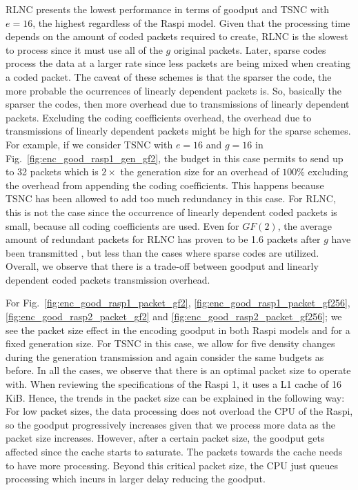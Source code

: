 \ac{RLNC} presents the lowest performance in terms of goodput and
\ac{TSNC} with $e = 16$, the highest regardless of the \ac{Raspi} model.
Given that the processing time depends on the amount of coded packets
required to create, \ac{RLNC} is the slowest to process since it must
use all of the $g$ original packets.
Later, sparse codes process the data
at a larger rate since less packets are being mixed when creating a
coded packet. The caveat of these schemes is that the sparser the code,
the more probable the ocurrences of linearly dependent packets is. So, basically
the sparser the codes, then more overhead due to transmissions of linearly dependent
packets.
Excluding the coding coefficients overhead, the overhead due to
transmissions of linearly dependent packets might be high for the sparse schemes.
For example, if we consider \ac{TSNC} with $e = 16$ and $g = 16$
in Fig.~\ref{fig:enc_good_rasp1_gen_gf2}, the budget in this case permits
to send up to 32 packets which is $2\times$ the generation
size for an overhead of $100\%$ excluding the overhead from appending
the coding coefficients. This happens because \ac{TSNC}
has been allowed to add too much redundancy in this case.
For \ac{RLNC},
this is not the case since the occurrence of linearly dependent coded packets is
small, because all coding coefficients are used. Even for $GF(2)$, the
average amount of redundant packets for \ac{RLNC} has proven to be 1.6
packets after $g$ have been transmitted \cite{trullols2011exact,zhao2012notes},
but less than the cases where sparse codes are utilized. Overall, we
observe that there is a trade-off between goodput and linearly dependent coded
packets transmission overhead.

For Fig.~\ref{fig:enc_good_rasp1_packet_gf2},
\ref{fig:enc_good_rasp1_packet_gf256}, \ref{fig:enc_good_rasp2_packet_gf2}
and \ref{fig:enc_good_rasp2_packet_gf256}; we see the packet
size effect in the encoding goodput in both \ac{Raspi} models and for
a fixed generation size. For \ac{TSNC} in this case, we allow for five density
changes during the generation transmission and again consider the same
budgets as before. In all the cases, we observe that there is an
optimal packet size to operate with. When reviewing the specifications
of the \ac{Raspi} 1, it uses a L1 cache of 16 KiB. Hence, the trends
in the packet size can be explained in the following way: For low packet
sizes, the data processing does not overload the \ac{CPU} of the
\ac{Raspi}, so the goodput progressively increases given that we
process more data as the packet size increases. However, after a certain
packet size, the goodput gets affected since the cache starts to saturate.
The packets towards the cache needs to have more processing. Beyond this
critical packet size, the \ac{CPU} just queues processing which incurs in
larger delay reducing the goodput.

